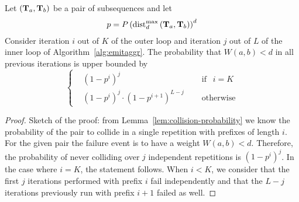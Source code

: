 \begin{lemma}
    \label{lemma:stop}
    Let $(\mathbf{T}_{a}, \mathbf{T}_{b})$ be a pair of subsequences and let
    \[
    \begin{aligned}
    p = P\left(\operatorname{dist}^{\max}_{d}\left(\mathbf{T}_{a},\mathbf{T}_{b}\right)\right)^d
    \end{aligned}
    \]
    Consider iteration $i$ out of $K$ of the outer loop
    and iteration $j$ out of $L$ of the inner loop of Algorithm~\ref{alg:emitaggr}.
    The probability that $W(a,b) < d$ in all previous iterations is
    upper bounded by
    \begin{equation}
    \label{eq:probnotcolliding}
      \left\{
        \begin{aligned}
        &\left(1-p^i\right)^j \quad &\textrm{ if }~~ i=K \\
        &\left(1-p^i\right)^j \cdot \left(1-p^{i+1}\right)^{L-j} \quad&\textrm{ otherwise}
        \end{aligned}
      \right.
    \end{equation}
\end{lemma}
\begin{proof}Sketch of the proof:
from Lemma~\ref{lem:collision-probability} we know the probability of the pair to collide in a single repetition with prefixes of length $i$. For the given pair the failure event is to have a weight $W(a,b)<d$. Therefore, the probability of never colliding over $j$ independent repetitions is $(1-p^i)^j$.
In the case where $i=K$, the statement follows.
When $i <K$, we consider that the first $j$ iterations performed with prefix $i$ fail independently and that the $L-j$ iterations previously run with prefix $i+1$ failed as well.
\end{proof}



